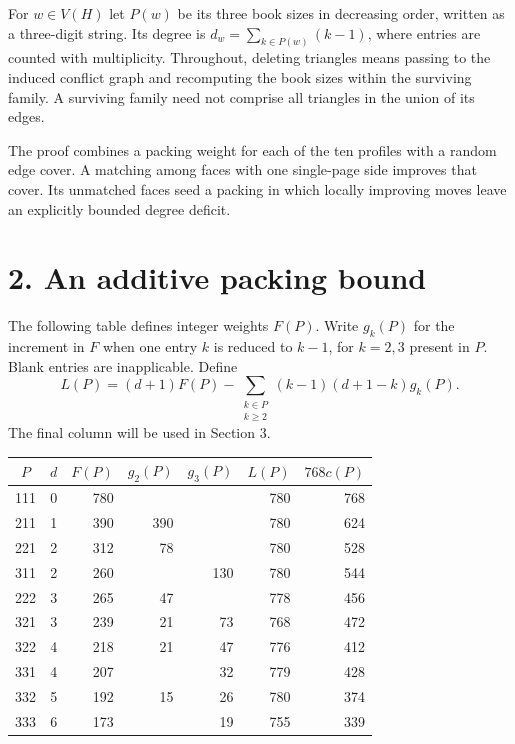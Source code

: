 \documentclass[11pt,a4paper]{article}
\begin{document}
For \(w\in V(H)\) let \(P(w)\) be its three book sizes in decreasing order,
written as a three-digit string. Its degree is \(d_w=\sum_{k\in P(w)}(k-1)\),
where entries are counted with multiplicity. Throughout, deleting triangles
means passing to the induced conflict graph and recomputing the book sizes
within the surviving family. A surviving family need not comprise all
triangles in the union of its edges.

The proof combines a packing weight for each of the ten profiles with a
random edge cover. A matching among faces with one single-page side improves
that cover. Its unmatched faces seed a packing in which locally improving
moves leave an explicitly bounded degree deficit.

\newpage
\section*{2. An additive packing bound}

The following table defines integer weights \(F(P)\). Write \(g_k(P)\)
for the increment in \(F\) when one entry \(k\) is reduced to \(k-1\),
for \(k=2,3\) present in \(P\). Blank entries are inapplicable. Define
\[
 L(P)=(d+1)F(P)-
     \sum_{\substack{k\in P\\ k\ge2}}(k-1)(d+1-k)g_k(P).
\]
The final column will be used in Section 3.

\begin{center}
\begin{tabular}{crrrrrr}
\toprule
\(P\)&\(d\)&\(F(P)\)&\(g_2(P)\)&\(g_3(P)\)&\(L(P)\)&\(768c(P)\)\\
\midrule
111&0&780& & &780&768\\
211&1&390&390& &780&624\\
221&2&312&78& &780&528\\
311&2&260& &130&780&544\\
222&3&265&47& &778&456\\
321&3&239&21&73&768&472\\
322&4&218&21&47&776&412\\
331&4&207& &32&779&428\\
332&5&192&15&26&780&374\\
333&6&173& &19&755&339\\
\bottomrule
\end{tabular}
\end{center}
\end{document}
